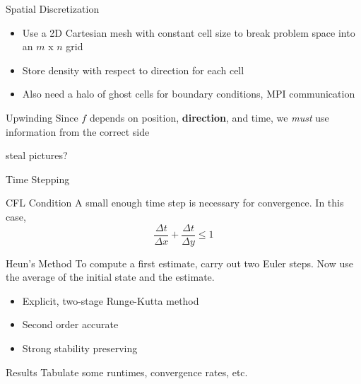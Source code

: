\documentclass{beamer}
\begin{document}
    \begin{frame}{Spatial Discretization}
        \begin{itemize}
            \item Use a 2D Cartesian mesh with constant cell size to break problem space into an $m$ x $n$ grid
            \item Store density with respect to direction for each cell
            \item Also need a halo of ghost cells for boundary conditions, MPI communication
        \end{itemize}

        \vfill

        \begin{block}{Upwinding}
            Since $f$ depends on position, \textbf{direction}, and time, we \emph{must} use information from the correct side

            \alert{steal pictures?}
        \end{block}
    \end{frame}

    \begin{frame}{Time Stepping}
        \begin{block}{CFL Condition}
            A small enough time step is necessary for convergence. In this case,
            \begin{equation*}
                \frac{\Delta t}{\Delta x} + \frac{\Delta t}{\Delta y} \leq 1
            \end{equation*}
        \end{block}

        \vfill

        \begin{block}{Heun's Method}
            To compute a first estimate, carry out two Euler steps.
            Now use the average of the initial state and the estimate.
            \begin{itemize}
                \item Explicit, two-stage Runge-Kutta method
                \item Second order accurate
                \item Strong stability preserving
            \end{itemize}
        \end{block}
    \end{frame}

    \begin{frame}{Results}
        Tabulate some runtimes, convergence rates, etc.
    \end{frame}
\end{document}
